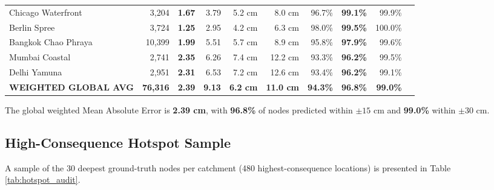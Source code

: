 \documentclass[conference]{IEEEtran}
\begin{document}
\begin{table}[t]
\begin{tabular}{lrrrrrrrrr}
Chicago Waterfront & 3,204 & \textbf{1.67} & 3.79 & 5.2 cm & 8.0 cm & 96.7\% & \textbf{99.1\%} & 99.9\% \\
Berlin Spree & 3,724 & \textbf{1.25} & 2.95 & 4.2 cm & 6.3 cm & 98.0\% & \textbf{99.5\%} & 100.0\% \\
Bangkok Chao Phraya & 10,399 & \textbf{1.99} & 5.51 & 5.7 cm & 8.9 cm & 95.8\% & \textbf{97.9\%} & 99.6\% \\
Mumbai Coastal & 2,741 & \textbf{2.35} & 6.26 & 7.4 cm & 12.2 cm & 93.3\% & \textbf{96.2\%} & 99.5\% \\
Delhi Yamuna & 2,951 & \textbf{2.31} & 6.53 & 7.2 cm & 12.6 cm & 93.4\% & \textbf{96.2\%} & 99.1\% \\
\midrule
\textbf{WEIGHTED GLOBAL AVG} & \textbf{76,316} & \textbf{2.39} & \textbf{9.13} & \textbf{6.2 cm} & \textbf{11.0 cm} & \textbf{94.3\%} & \textbf{96.8\%} & \textbf{99.0\%} \\
\bottomrule
\end{tabular}
\end{table}

The global weighted Mean Absolute Error is \textbf{2.39 cm}, with \textbf{96.8\%} of nodes predicted within $\pm 15\text{ cm}$ and \textbf{99.0\%} within $\pm 30\text{ cm}$.

\subsection{High-Consequence Hotspot Sample}
A sample of the 30 deepest ground-truth nodes per catchment (480 highest-consequence locations) is presented in Table \ref{tab:hotspot_audit}.
\end{document}
